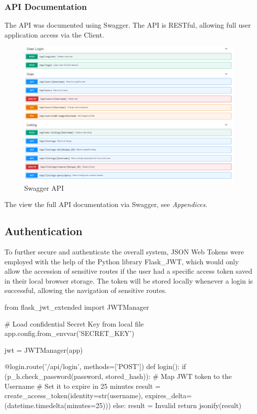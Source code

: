 \subsubsection{API Documentation}
The API was documented using Swagger. The API is RESTful, allowing full user application access via the Client.  
\begin{figure}[H]
	\caption{Swagger API}
	\label{image:routing}
	\centering
	\includegraphics[width=1\textwidth]{images/api.png}
\end{figure}
The view the full API documentation via Swagger, see \textit{Appendices}. 

\subsection{Authentication}
To further secure and authenticate the overall system, JSON Web Tokens were employed with the help of the Python library Flask\_JWT, which would only allow the accession of sensitive routes if the user had a specific access token saved in their local browser storage. The token will be stored locally whenever a login is successful, allowing the navigation of sensitive routes.  \newline
\newpage
\begin{python}[caption=Issuing a limited JWT Token ]
from flask_jwt_extended import JWTManager

# Load confidential Secret Key from local file
app.config.from_envvar('SECRET_KEY')

jwt = JWTManager(app)

@login.route('/api/login', methods=['POST'])
def login():
    if (p_h.check_password(password, stored_hash)): 
        # Map JWT token to the Username
        # Set it to expire in 25 minutes
        result = create_access_token(identity=str(username), expires_delta=(datetime.timedelta(minutes=25)))
    else:
        result = Invalid
    return jsonify(result)
\end{python}
      
